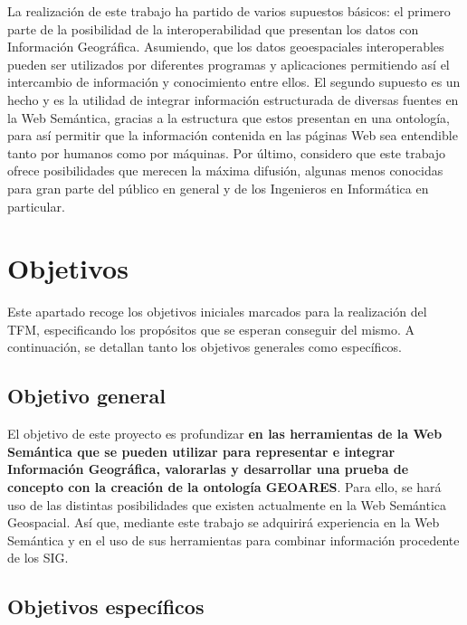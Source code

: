 La realización de este trabajo ha partido de varios supuestos básicos: el primero parte de la posibilidad de la interoperabilidad que presentan los datos con Información Geográfica. Asumiendo, que los datos geoespaciales interoperables pueden ser utilizados por diferentes programas y aplicaciones permitiendo así el intercambio de información y conocimiento entre ellos. El segundo supuesto es un hecho y es la utilidad de integrar información estructurada de diversas fuentes en la Web Semántica, gracias a la estructura que estos presentan en una ontología, para así permitir que la información contenida en las páginas Web sea entendible tanto por humanos como por máquinas. Por último, considero que este trabajo ofrece posibilidades que merecen la máxima difusión, algunas menos conocidas para gran parte del público en general y de los Ingenieros en Informática en particular.


\section{Objetivos}


Este apartado recoge los objetivos iniciales marcados para la realización del TFM, especificando los propósitos que se esperan conseguir del mismo. A continuación, se detallan tanto los objetivos generales como específicos.

\subsection{Objetivo general}

El objetivo de este proyecto es profundizar \textbf{en las herramientas de la Web Semántica que se pueden utilizar para representar e integrar Información Geográfica, valorarlas y desarrollar una prueba de concepto con la creación de la ontología GEOARES}. Para ello, se hará uso de las distintas posibilidades que existen actualmente en la Web Semántica Geospacial. Así que, mediante este trabajo se adquirirá experiencia en la Web Semántica y en el uso de sus herramientas para combinar información procedente de los SIG.

\subsection{Objetivos específicos}

